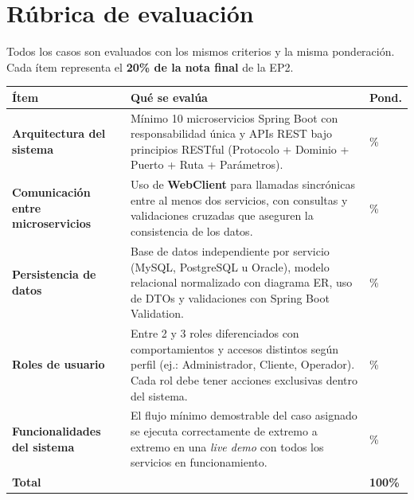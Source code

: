 \documentclass[12pt]{article}
\begin{document}
\vspace{0.5em}

\section*{Rúbrica de evaluación}

Todos los casos son evaluados con los mismos criterios y la misma ponderación.
Cada ítem representa el \textbf{20\% de la nota final} de la EP2.

\vspace{0.5em}

\begin{center}
\renewcommand{\arraystretch}{2.0}
\begin{tabular}{
    >{\raggedright\arraybackslash}p{4.8cm}
    >{\raggedright\arraybackslash}p{8.5cm}
    >{\centering\arraybackslash}p{1.8cm}
}
\toprule
\rowcolor{blue!12}
\textbf{Ítem} & \textbf{Qué se evalúa} & \textbf{Pond.} \\
\midrule
\textbf{Arquitectura del sistema}
    & Mínimo 10 microservicios Spring Boot con responsabilidad única
      y APIs REST bajo principios RESTful (Protocolo + Dominio + Puerto +
      Ruta + Parámetros).
    & 20\% \\
\midrule
\textbf{Comunicación entre microservicios}
    & Uso de \textbf{WebClient} para llamadas sincrónicas entre al menos
      dos servicios, con consultas y validaciones cruzadas que aseguren
      la consistencia de los datos.
    & 20\% \\
\midrule
\textbf{Persistencia de datos}
    & Base de datos independiente por servicio (MySQL, PostgreSQL u Oracle),
      modelo relacional normalizado con diagrama ER, uso de DTOs y
      validaciones con Spring Boot Validation.
    & 20\% \\
\midrule
\textbf{Roles de usuario}
    & Entre 2 y 3 roles diferenciados con comportamientos y accesos
      distintos según perfil (ej.: Administrador, Cliente, Operador).
      Cada rol debe tener acciones exclusivas dentro del sistema.
    & 20\% \\
\midrule
\textbf{Funcionalidades del sistema}
    & El flujo mínimo demostrable del caso asignado se ejecuta correctamente
      de extremo a extremo en una \textit{live demo} con todos los servicios
      en funcionamiento.
    & 20\% \\
\midrule
\rowcolor{gray!10}
\textbf{Total} & & \textbf{100\%} \\
\bottomrule
\end{tabular}
\end{center}
\end{document}
